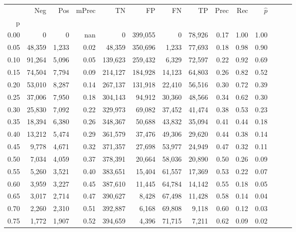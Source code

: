\begin{tabular}{rrrrrrrrrrrrrr}
\toprule
{} &     Neg &    Pos & mPrec &       TN &       FP &      FN &      TP &  Prec &   Rec & $\hat{p}$ \\
p    &         &        &       &          &          &         &         &       &       &           \\
\midrule
0.00 &       0 &      0 &   nan &        0 &  399,055 &       0 &  78,926 &  0.17 &  1.00 &      1.00 \\
0.05 &  48,359 &  1,233 &  0.02 &   48,359 &  350,696 &   1,233 &  77,693 &  0.18 &  0.98 &      0.90 \\
0.10 &  91,264 &  5,096 &  0.05 &  139,623 &  259,432 &   6,329 &  72,597 &  0.22 &  0.92 &      0.69 \\
0.15 &  74,504 &  7,794 &  0.09 &  214,127 &  184,928 &  14,123 &  64,803 &  0.26 &  0.82 &      0.52 \\
0.20 &  53,010 &  8,287 &  0.14 &  267,137 &  131,918 &  22,410 &  56,516 &  0.30 &  0.72 &      0.39 \\
0.25 &  37,006 &  7,950 &  0.18 &  304,143 &   94,912 &  30,360 &  48,566 &  0.34 &  0.62 &      0.30 \\
0.30 &  25,830 &  7,092 &  0.22 &  329,973 &   69,082 &  37,452 &  41,474 &  0.38 &  0.53 &      0.23 \\
0.35 &  18,394 &  6,380 &  0.26 &  348,367 &   50,688 &  43,832 &  35,094 &  0.41 &  0.44 &      0.18 \\
0.40 &  13,212 &  5,474 &  0.29 &  361,579 &   37,476 &  49,306 &  29,620 &  0.44 &  0.38 &      0.14 \\
0.45 &   9,778 &  4,671 &  0.32 &  371,357 &   27,698 &  53,977 &  24,949 &  0.47 &  0.32 &      0.11 \\
0.50 &   7,034 &  4,059 &  0.37 &  378,391 &   20,664 &  58,036 &  20,890 &  0.50 &  0.26 &      0.09 \\
0.55 &   5,260 &  3,521 &  0.40 &  383,651 &   15,404 &  61,557 &  17,369 &  0.53 &  0.22 &      0.07 \\
0.60 &   3,959 &  3,227 &  0.45 &  387,610 &   11,445 &  64,784 &  14,142 &  0.55 &  0.18 &      0.05 \\
0.65 &   3,017 &  2,714 &  0.47 &  390,627 &    8,428 &  67,498 &  11,428 &  0.58 &  0.14 &      0.04 \\
0.70 &   2,260 &  2,310 &  0.51 &  392,887 &    6,168 &  69,808 &   9,118 &  0.60 &  0.12 &      0.03 \\
0.75 &   1,772 &  1,907 &  0.52 &  394,659 &    4,396 &  71,715 &   7,211 &  0.62 &  0.09 &      0.02 \\

\end{tabular}
